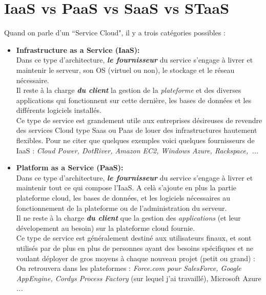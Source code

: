 \section{IaaS vs PaaS vs SaaS vs STaaS}

Quand on parle d'un ``Service Cloud", il y a trois catégories possibles :

\begin{itemize}
	\item \textbf{Infrastructure as a Service (IaaS):}\\ 
	
	Dans ce type d'architecture, \emph{\textbf{le fournisseur}} du service s'engage à livrer et maintenir le serveur, son OS (virtuel ou non), le stockage et le réseau nécessaire.\\
			
	Il reste à la charge \emph{\textbf{du client}} la gestion de la \textit{plateforme} et des diverses applications qui fonctionnent sur cette dernière, les bases de données et les différents logiciels installés.\\
	
	Ce type de service est grandement utile aux entreprises désireuses de revendre des services Cloud type Saas ou Paas de louer des infrastructures hautement flexibles. Pour ne citer que quelques exemples voici quelques fournisseurs de IaaS :\emph{ Cloud Power, DotRiver, Amazon EC2, Windows Azure, Rackspace,~...}\\
			\vspace{8mm}
			
		
	\item \textbf{Platform as a Service (PaaS):}\\
	
	Dans ce type d'architecture, \emph{\textbf{le fournisseur}} du service s'engage à livrer et maintenir tout ce qui compose l'IaaS. A celà s'ajoute en plus la partie plateforme cloud, les bases de données, et les logiciels nécessaires au fonctionnement de la plateforme ou de l'administration du serveur.\\
			
	Il ne reste à la charge \emph{\textbf{du client}} que la gestion des \textit{applications} (et leur dévelopement au besoin) sur la plateforme cloud fournie.\\

Ce type de service est généralement destiné aux utilisateurs finaux, et sont utilisés par de plus en plus de personnes ayant des besoins spécifiques et ne voulant déployer de gros moyens à chaque nouveau projet (petit ou grand) : On retrouvera dans les plateformes : \emph{Force.com pour SalesForce, Google AppEngine, Cordys Process Factory} (sur lequel j'ai travaillé), Microsoft Azure \emph{...}\\
			\vspace{8mm}
	

\end{itemize}
